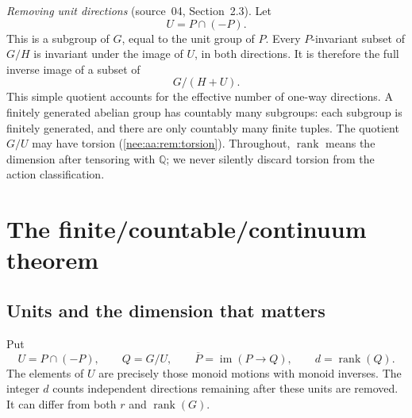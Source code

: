 \documentclass[11pt,letterpaper]{article}
\numberwithin{equation}{section}
\theoremstyle{plain}
\theoremstyle{definition}
\theoremstyle{remark}
\newcommand{\QQ}{\mathbb Q}
\newcommand{\rank}{\operatorname{rank}}
\begin{document}
\emph{Removing unit directions} (source~04, Section~2.3).
Let
\[
U=P\cap(-P).
\]
This is a subgroup of $G$, equal to the unit group of $P$.
Every $P$-invariant subset of $G/H$ is invariant under the image
of $U$, in both directions. It is therefore the full inverse image
of a subset of
\[
G/(H+U).
\]
This simple quotient accounts for the effective number of one-way
directions. A finitely generated abelian group has countably many
subgroups: each subgroup is finitely generated, and there are only
countably many finite tuples.
The quotient $G/U$ may have torsion (\cref{nee:aa:rem:torsion}).
Throughout, $\rank$ means the
dimension after tensoring with $\QQ$; we never silently discard
torsion from the action classification.

\section{The finite/countable/continuum theorem}\label{nee:aa:sec:trichotomy}
\label{nee:ci:sec:types}

\subsection{Units and the dimension that matters}

Put
\[
U=P\cap(-P),\qquad Q=G/U,\qquad \overline P=\operatorname{im}(P\to Q),
\qquad d=\rank(Q).
\]
The elements of $U$ are precisely those monoid motions with monoid inverses.
The integer $d$ counts independent directions remaining after these units
are removed. It can differ from both $r$ and $\rank(G)$.
\end{document}
